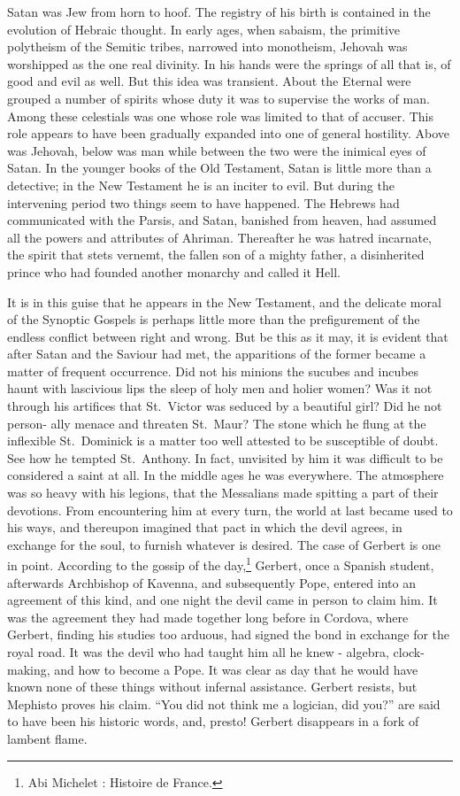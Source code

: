 \documentclass[]{book}
\let\rmarkdownfootnote\footnote%
\def\footnote{\protect\rmarkdownfootnote}
\begin{document}
Satan was Jew from horn to hoof. The registry of his birth is contained
in the evolution of Hebraic thought. In early ages, when sabaism, the
primitive polytheism of the Semitic tribes, narrowed into monotheism,
Jehovah was worshipped as the one real divinity. In his hands were the
springs of all that is, of good and evil as well. But this idea was
transient. About the Eternal were grouped a number of spirits whose duty
it was to supervise the works of man. Among these celestials was one
whose role was limited to that of accuser. This role appears to have
been gradually expanded into one of general hostility. Above was
Jehovah, below was man while between the two were the inimical eyes of
Satan. In the younger books of the Old Testament, Satan is little more
than a detective; in the New Testament he is an inciter to evil. But
during the intervening period two things seem to have happened. The
Hebrews had communicated with the Parsis, and Satan, banished from
heaven, had assumed all the powers and attributes of Ahriman. Thereafter
he was hatred incarnate, the spirit that stets vernemt, the fallen son
of a mighty father, a disinherited prince who had founded another
monarchy and called it Hell.

It is in this guise that he appears in the New Testament, and the
delicate moral of the Synoptic Gospels is perhaps little more than the
prefigurement of the endless conflict between right and wrong. But be
this as it may, it is evident that after Satan and the Saviour had met,
the apparitions of the former became a matter of frequent occurrence.
Did not his minions the sucubes and incubes haunt with lascivious lips
the sleep of holy men and holier women? Was it not through his artifices
that St.~Victor was seduced by a beautiful girl? Did he not person- ally
menace and threaten St.~Maur? The stone which he flung at the inflexible
St.~Dominick is a matter too well attested to be susceptible of doubt.
See how he tempted St.~Anthony. In fact, unvisited by him it was
difficult to be considered a saint at all. In the middle ages he was
everywhere. The atmosphere was so heavy with his legions, that the
Messalians made spitting a part of their devotions. From encountering
him at every turn, the world at last became used to his ways, and
thereupon imagined that pact in which the devil agrees, in exchange for
the soul, to furnish whatever is desired. The case of Gerbert is one in
point. According to the gossip of the day,\footnote{Abi Michelet :
  Histoire de France.} Gerbert, once a Spanish student, afterwards
Archbishop of Kavenna, and subsequently Pope, entered into an agreement
of this kind, and one night the devil came in person to claim him. It
was the agreement they had made together long before in Cordova, where
Gerbert, finding his studies too arduous, had signed the bond in
exchange for the royal road. It was the devil who had taught him all he
knew - algebra, clock-making, and how to become a Pope. It was clear as
day that he would have known none of these things without infernal
assistance. Gerbert resists, but Mephisto proves his claim. ``You did
not think me a logician, did you?'' are said to have been his historic
words, and, presto! Gerbert disappears in a fork of lambent flame.
\end{document}
